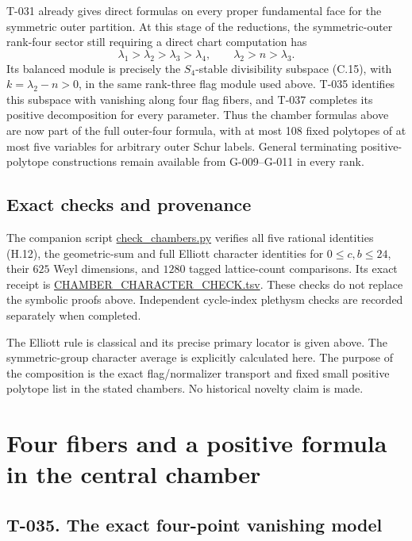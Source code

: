 \documentclass[
  10pt,
]{article}
\begin{document}
T-031 already gives direct formulas on every proper fundamental face for
the symmetric outer partition. At this stage of the reductions, the
symmetric-outer rank-four sector still requiring a direct chart
computation has \[
\lambda_1>\lambda_2>\lambda_3>\lambda_4,
\qquad \lambda_2>n>\lambda_3.
\tag{H.20}
\] Its balanced module is precisely the \(S_4\)-stable divisibility
subspace (C.15), with \(k=\lambda_2-n>0\), in the same rank-three flag
module used above. T-035 identifies this subspace with vanishing along
four flag fibers, and T-037 completes its positive decomposition for
every parameter. Thus the chamber formulas above are now part of the
full outer-four formula, with at most 108 fixed polytopes of at most
five variables for arbitrary outer Schur labels. General terminating
positive-polytope constructions remain available from G-009--G-011 in
every rank.

\subsection{Exact checks and
provenance}\label{exact-checks-and-provenance}

The companion script \url{check_chambers.py} verifies all five rational
identities (H.12), the geometric-sum and full Elliott character
identities for \(0\le c,b\le24\), their \(625\) Weyl dimensions, and
\(1280\) tagged lattice-count comparisons. Its exact receipt is
\url{CHAMBER_CHARACTER_CHECK.tsv}. These checks do not replace the
symbolic proofs above. Independent cycle-index plethysm checks are
recorded separately when completed.

The Elliott rule is classical and its precise primary locator is given
above. The symmetric-group character average is explicitly calculated
here. The purpose of the composition is the exact flag/normalizer
transport and fixed small positive polytope list in the stated chambers.
No historical novelty claim is made.

\section{Four fibers and a positive formula in the central
chamber}\label{four-fibers-and-a-positive-formula-in-the-central-chamber}

\subsection{T-035. The exact four-point vanishing
model}\label{t-035.-the-exact-four-point-vanishing-model}
\end{document}
